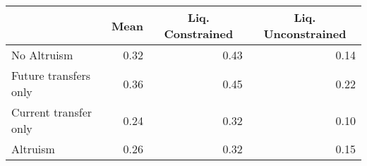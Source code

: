 \begin{tabular}{lrrr}
\toprule
  & \multicolumn{1}{c}{Mean} & \multicolumn{1}{c}{Liq. Constrained} & \multicolumn{1}{c}{Liq. Unconstrained} \\
\midrule
No Altruism & 0.32 & 0.43 & 0.14\\
\;Future transfers only & 0.36 & 0.45 & 0.22\\
\;Current transfer only & 0.24 & 0.32 & 0.10\\
Altruism & 0.26 & 0.32 & 0.15\\
\bottomrule
\end{tabular}
